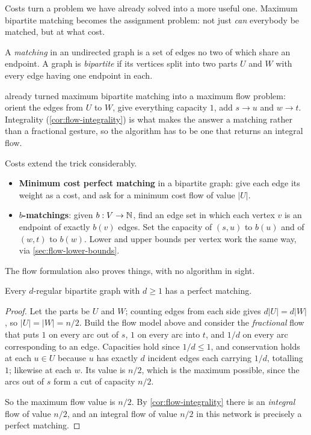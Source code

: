 Costs turn a problem we have already solved into a more useful one. Maximum
bipartite matching becomes the assignment problem: not just \emph{can}
everybody be matched, but at what cost.

\begin{definition}
A \emph{matching} in an undirected graph is a set of edges no two of which share
an endpoint. A graph is \emph{bipartite} if its vertices split into two parts
$U$ and $W$ with every edge having one endpoint in each.
\end{definition}

 already turned maximum bipartite matching into a
maximum flow problem: orient the edges from $U$ to $W$, give everything capacity
$1$, add $s \to u$ and $w \to t$. Integrality
(\cref{cor:flow-integrality}) is what makes the answer a matching rather than a
fractional gesture, so the algorithm has to be one that returns an integral
flow.

Costs extend the trick considerably.
\begin{itemize}[leftmargin=*]
  \item \textbf{Minimum cost perfect matching} in a bipartite graph: give each
        edge its weight as a cost, and ask for a minimum cost flow of value
        $|U|$.
  \item \textbf{$b$-matchings}: given $b : V \to \mathbb{N}$, find an edge set in which
        each vertex $v$ is an endpoint of exactly $b(v)$ edges. Set the capacity
        of $(s,u)$ to $b(u)$ and of $(w,t)$ to $b(w)$. Lower and upper bounds
        per vertex work the same way, via \cref{sec:flow-lower-bounds}.
\end{itemize}

The flow formulation also proves things, with no algorithm in sight.

\begin{theorem}\label{thm:mcf-regular-bipartite}
Every $d$-regular bipartite graph with $d \ge 1$ has a perfect matching.
\end{theorem}

\begin{proof}
Let the parts be $U$ and $W$; counting edges from each side gives
$d|U| = d|W|$, so $|U| = |W| = n/2$. Build the flow model above and consider the
\emph{fractional} flow that puts $1$ on every arc out of $s$, $1$ on every arc
into $t$, and $1/d$ on every arc corresponding to an edge. Capacities hold since
$1/d \le 1$, and conservation holds at each $u \in U$ because $u$ has exactly
$d$ incident edges each carrying $1/d$, totalling $1$; likewise at each $w$. Its
value is $n/2$, which is the maximum possible, since the arcs out of $s$ form a
cut of capacity $n/2$.

So the maximum flow value is $n/2$. By \cref{cor:flow-integrality} there is an
\emph{integral} flow of value $n/2$, and an integral flow of value $n/2$ in this
network is precisely a perfect matching.
\end{proof}

